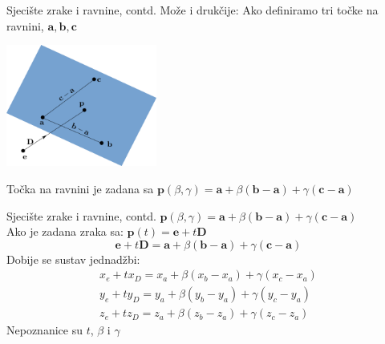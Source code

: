 \documentclass[9pt]{beamer}
\begin{document}
\begin{frame}{Sjecište zrake i ravnine, contd.}
	Može i drukčije: Ako definiramo tri točke na ravnini, $\mathbf{a}, \mathbf{b}, \mathbf{c}$ 
	\begin{center}
		\includegraphics[height=4cm]{./slike/sjeciste_ravnina_pravac_02.png}
	\end{center}
	Točka na ravnini je zadana sa 
	$\textbf{p}(\beta, \gamma) = \textbf{a} + \beta(\textbf{b}-\textbf{a}) + \gamma(\textbf{c}-\textbf{a})$
\end{frame}	

\begin{frame}{Sjecište zrake i ravnine, contd.}
	$\textbf{p}(\beta, \gamma) = \textbf{a} + \beta(\textbf{b}-\textbf{a}) + \gamma(\textbf{c}-\textbf{a})$ 
	\\
	Ako je zadana zraka sa: $\textbf{p}(t) = \textbf{e}+t\textbf{D}$
	$$\textbf{e}+t\textbf{D} = \textbf{a} + \beta(\textbf{b}-\textbf{a}) + \gamma(\textbf{c}-\textbf{a})$$
	Dobije se sustav jednadžbi:
	\begin{align*}
	x_e+tx_D = x_a + \beta(x_b-x_a) + \gamma(x_c-x_a)\\
	y_e+ty_D = y_a + \beta(y_b-y_a) + \gamma(y_c-y_a)\\
	z_e+tz_D = z_a + \beta(z_b-z_a) + \gamma(z_c-z_a)
	\end{align*}
	Nepoznanice su $t$, $\beta$ i $\gamma$
\end{frame}	
\end{document}
